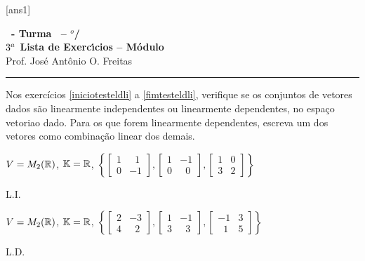 \documentclass[12pt]{exam}
\begin{document}
    [ans1]
    
    \begin{center}
        {\Large\bf \disciplina\ - Turma \turma\ -- \semestre$^{o}$/\ano} \\ \vspace{9pt} {\large\bf
            $3^a$ Lista de Exerc{\'\i}cios -- Módulo \numeromodulo}\\ \vspace{9pt} Prof. Jos{\'e} Ant{\^o}nio O. Freitas
    \end{center}
    
    \hrule

    Nos exercícios \ref{iniciotesteldli} a \ref{fimtesteldli}, verifique se os conjuntos de vetores dados são 
    linearmente independentes ou linearmente dependentes, 
    no espaço vetoriao dado. Para os que forem linearmente dependentes,
    escreva um dos vetores como combinação linear dos demais.

    \begin{exercicio}\label{iniciotesteldli}
        $V = M_2(\mathbb{R})$, $\mathbb{K} = \mathbb{R}$,
        $
            \left\{
                \begin{bmatrix}
                    1 & \phantom{x} 1\\
                    0 & -1
                \end{bmatrix},
                \begin{bmatrix}
                    1 & -1\\
                    0 & \phantom{x} 0
                \end{bmatrix},
                \begin{bmatrix}
                    1 & 0\\
                    3 & 2
                \end{bmatrix}
            \right\}
        $
        \begin{solucao}
            L.I.
        \end{solucao}
    \end{exercicio}

    \begin{exercicio}
        $V = M_2(\mathbb{R})$, $\mathbb{K} = \mathbb{R}$,
        $
            \left\{
                \begin{bmatrix}
                    2 & -3\\
                    4 & \phantom{x} 2
                \end{bmatrix},
                \begin{bmatrix}
                    1 & -1\\
                    3 & \phantom{x} 3
                \end{bmatrix},
                \begin{bmatrix}
                    -1 & 3\\
                    \phantom{x} 1 & 5
                \end{bmatrix}
            \right\}
        $
        \begin{solucao}
            L.D.
        \end{solucao}
    \end{exercicio}
    
\end{document}

